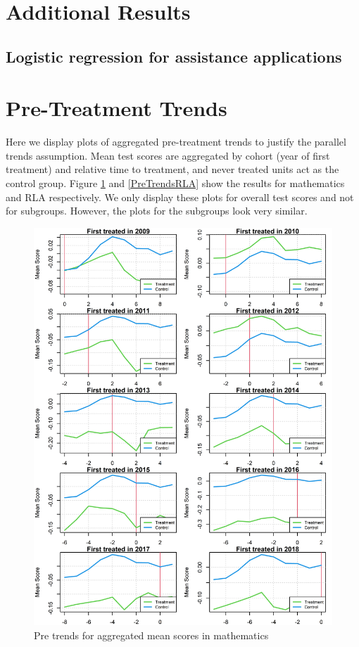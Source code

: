 
\section{Additional Results} \label{AppendixA}

\subsection{Logistic regression for assistance applications}





\section{Pre-Treatment Trends} \label{PreTrends}

Here we display plots of aggregated pre-treatment trends to justify the parallel trends assumption. Mean test scores are aggregated by cohort (year of first treatment) and relative time to treatment, and never treated units act as the control group. Figure \ref{PreTrendsMath} and \ref{PreTrendsRLA} show the results for mathematics and RLA respectively. We only display these plots for overall test scores and not for subgroups. However, the plots for the subgroups look very similar.


\begin{figure}[!h]
	\centering
	\includegraphics[scale=1]{"../Code & Data/ParTrendsPlotMathematics.png"}
	\caption{Pre trends for aggregated mean scores in mathematics}
	\label{PreTrendsMath}
\end{figure}

